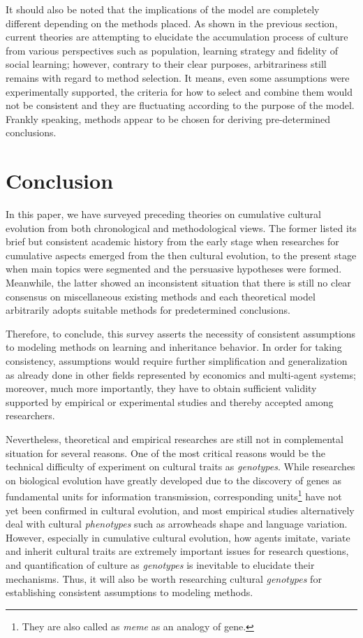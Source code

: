 \documentclass[a4paper, dvipdfmx]{article}
\begin{document}
It should also be noted that the implications of the model are completely different depending on the methods placed. As shown in the previous section, current theories are attempting to elucidate the accumulation process of culture from various perspectives such as population, learning strategy and fidelity of social learning; however, contrary to their clear purposes, arbitrariness still remains with regard to method selection. It means, even some assumptions were experimentally supported, the criteria for how to select and combine them would not be consistent and they are fluctuating according to the purpose of the model. Frankly speaking, methods appear to be chosen for deriving pre-determined conclusions.


\section{Conclusion}
In this paper, we have surveyed preceding theories on cumulative cultural evolution from both chronological and methodological views. The former listed its brief but consistent academic history from the early stage when researches for cumulative aspects emerged from the then cultural evolution, to the present stage when main topics were segmented and the persuasive hypotheses were formed. Meanwhile, the latter showed an inconsistent situation that there is still no clear consensus on miscellaneous existing methods and each theoretical model arbitrarily adopts suitable methods for predetermined conclusions.

Therefore, to conclude, this survey asserts the necessity of consistent assumptions to modeling methods on learning and inheritance behavior. In order for taking consistency, assumptions would require further simplification and generalization as already done in other fields represented by economics and multi-agent systems; moreover, much more importantly, they have to obtain sufficient validity supported by empirical or experimental studies and thereby accepted among researchers.

Nevertheless, theoretical and empirical researches are still not in complemental situation for several reasons. One of the most critical reasons would be the technical difficulty of experiment on cultural traits as {\it genotypes}. While researches on biological evolution have greatly developed due to the discovery of genes as fundamental units for information transmission, corresponding units\footnote{They are also called as {\it meme} as an analogy of gene.} have not yet been confirmed in cultural evolution, and most empirical studies alternatively deal with cultural {\it phenotypes} such as arrowheads shape and language variation. However, especially in cumulative cultural evolution, how agents imitate, variate and inherit cultural traits are extremely important issues for research questions, and quantification of culture as {\it genotypes} is inevitable to elucidate their mechanisms. Thus, it will also be worth researching cultural {\it genotypes} for establishing consistent assumptions to modeling methods.
\end{document}

